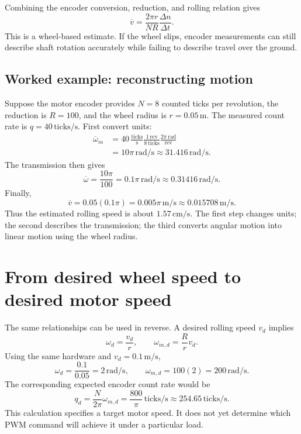 Combining the encoder conversion, reduction, and rolling relation gives
\begin{equation}
 \boxed{\overline v=\frac{2\pi r}{NR}\frac{\Delta n}{\Delta t}.}
 \label{eq:l08-speed}
\end{equation}
This is a wheel-based estimate. If the wheel slips, encoder measurements can
still describe shaft rotation accurately while failing to describe travel
over the ground.

\subsection{Worked example: reconstructing motion}
Suppose the motor encoder provides $N=8$ counted ticks per revolution,
the reduction is $R=100$, and the wheel radius is $r=0.05\,\mathrm m$.
The measured count rate is $q=40\,\mathrm{ticks/s}$. First convert units:
\begin{align*}
 \overline\omega_m
 &=40\,\frac{\mathrm{ticks}}{\mathrm s}
   \frac{1\,\mathrm{rev}}{8\,\mathrm{ticks}}
   \frac{2\pi\,\mathrm{rad}}{\mathrm{rev}}\\
 &=10\pi\,\mathrm{rad/s}\approx31.416\,\mathrm{rad/s}.
\end{align*}
The transmission then gives
\[
 \overline\omega=\frac{10\pi}{100}
 =0.1\pi\,\mathrm{rad/s}\approx0.31416\,\mathrm{rad/s}.
\]
Finally,
\[
 \overline v=0.05(0.1\pi)
 =0.005\pi\,\mathrm{m/s}\approx0.015708\,\mathrm{m/s}.
\]
Thus the estimated rolling speed is about $1.57\,\mathrm{cm/s}$.
The first step changes units; the second describes the transmission; the
third converts angular motion into linear motion using the wheel radius.

\section{From desired wheel speed to desired motor speed}
The same relationships can be used in reverse. A desired rolling speed
$v_d$ implies
\begin{equation}
 \omega_d=\frac{v_d}{r},\qquad
 \boxed{\omega_{m,d}=\frac{R}{r}v_d.}
 \label{eq:l08-desired}
\end{equation}
Using the same hardware and $v_d=0.1\,\mathrm{m/s}$,
\[
 \omega_d=\frac{0.1}{0.05}=2\,\mathrm{rad/s},\qquad
 \omega_{m,d}=100(2)=200\,\mathrm{rad/s}.
\]
The corresponding expected encoder count rate would be
\[
 q_d=\frac{N}{2\pi}\omega_{m,d}
 =\frac{800}{\pi}\,\mathrm{ticks/s}
 \approx254.65\,\mathrm{ticks/s}.
\]
This calculation specifies a target motor speed. It does not yet determine
which PWM command will achieve it under a particular load.

